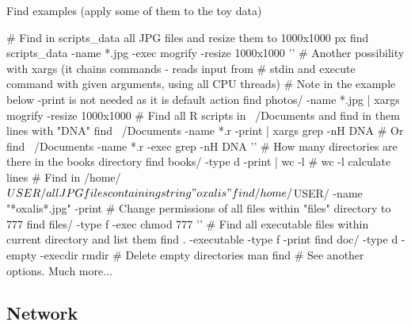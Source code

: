 \documentclass[compress, ucs, xelatex, 11pt, xcolor=svgnames,
  hyperref={
    bookmarks=true,
    unicode=true,
    colorlinks=true,
    pdftitle={Linux, command line and MetaCentrum},
    plainpages=false,
    pdfauthor={Vojtech Zeisek},
    pdfsubject={Course about use of Linux command line, writing shell scripts and using MetaCentrum of CESNET},
    pdfcreator={XeLaTeX},
    pdfkeywords={Linux, GNU, BASH, shell, command line, MetaCentrum},
    linkcolor=DarkRed,
    anchorcolor=DarkBlue,
    citecolor=Indigo,
    filecolor=NavyBlue,
    menucolor=DarkMagenta,
    urlcolor=DarkBlue,
    pdftex},
  url={hyphens, lowtilde} %
  ]{beamer}
\begin{document}
\begin{frame}[fragile]{Find examples (apply some of them to the toy data)}
  \begin{bashcode}
    # Find in scripts_data all JPG files and resize them to 1000x1000 px
    find scripts_data -name *.jpg -exec mogrify -resize 1000x1000 '{}' \;
    # Another possibility with xargs (it chains commands - reads input from
    # stdin and execute command with given arguments, using all CPU threads)
    # Note in the example below -print is not needed as it is default action
    find photos/ -name *.jpg | xargs mogrify -resize 1000x1000
    # Find all R scripts in ~/Documents and find in them lines with "DNA"
    find ~/Documents -name *.r -print | xargs grep -nH DNA # Or
    find ~/Documents -name *.r -exec grep -nH DNA '{}' \;
    # How many directories are there in the books directory
    find books/ -type d -print | wc -l # wc -l calculate lines
    # Find in /home/$USER/ all JPG files containing string "oxalis"
    find /home/$USER/ -name "*oxalis*.jpg" -print
    # Change permissions of all files within "files" directory to 777
    find files/ -type f -exec chmod 777 '{}' \;
    # Find all executable files within current directory and list them
    find . -executable -type f -print
    find doc/ -type d -empty -execdir rmdir {} \; # Delete empty directories
    man find # See another options. Much more...
  \end{bashcode}
\end{frame}

\subsection{Network}
\end{document}
